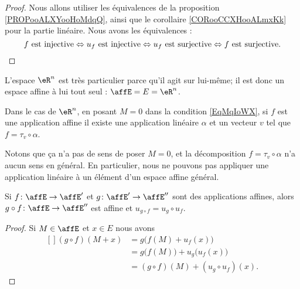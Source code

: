 \begin{proof}
	Nous allons utiliser les équivalences de la proposition \ref{PROPooALXYooHoMdqQ}, ainsi que le corollaire \ref{CORooCCXHooALmxKk} pour la partie linéaire. Nous avons les équivalences :
	\begin{equation}
		\text{\( f\) est injective} \Leftrightarrow \text{\( u_f\) est injective} \Leftrightarrow \text{\( u_f\) est surjective} \Leftrightarrow \text{\( f\) est surjective}.
	\end{equation}
\end{proof}

\begin{example}     \label{EXooAGINooYmvPML}
	L'espace \( \eR^n\) est très particulier parce qu'il agit sur lui-même; il est donc un espace affine à lui tout seul : \( \affE=E=\eR^n\).

	Dans le cas de \( \eR^n\), en posant \( M=0\) dans la condition \eqref{EqMqIoWX}, si \( f\) est une application affine il existe une application linéaire \( \alpha\) et un vecteur \( v\) tel que \( f=\tau_v\circ \alpha\).

	Notons que ça n'a pas de sens de poser \( M=0\), et la décomposition \( f=\tau_v\circ \alpha\) n'a aucun sens en général. En particulier, nous ne pouvons pas appliquer une application linéaire à un élément d'un espace affine général.
\end{example}

\begin{proposition}     \label{PROPooOUNEooQUZetW}
	Si \( f\colon \affE\to \affE'\) et \( g\colon \affE'\to \affE''\) sont des applications affines, alors \( g\circ f\colon \affE\to \affE''\) est affine et \( u_{g\circ f}=u_g\circ u_f\).
\end{proposition}

\begin{proof}
	Si \( M\in\affE\) et \( x\in E\) nous avons
	\begin{equation}
		\begin{aligned}[]
			(g\circ f)(M+x) & =g\big( f(M)+u_f(x) \big)                \\
			                & =g\big( f(M) \big)+u_g\big( u_f(x) \big) \\
			                & =(g\circ f)(M)+(u_g\circ u_f)(x).
		\end{aligned}
	\end{equation}
\end{proof}

